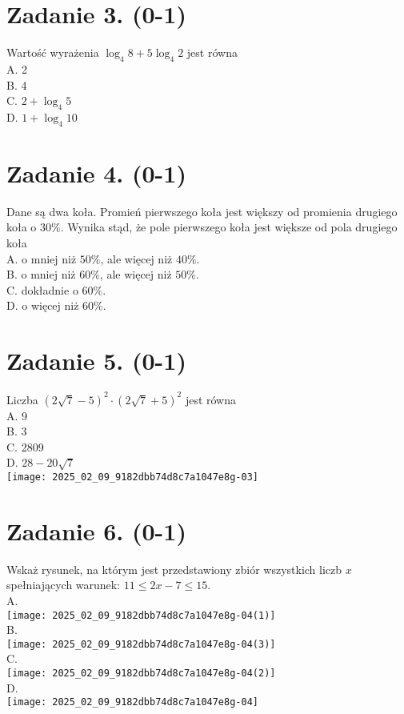 \documentclass[10pt]{article}
\begin{document}
\section*{Zadanie 3. (0-1)}
Wartość wyrażenia \(\log _{4} 8+5 \log _{4} 2\) jest równa\\
A. 2\\
B. 4\\
C. \(2+\log _{4} 5\)\\
D. \(1+\log _{4} 10\)

\section*{Zadanie 4. (0-1)}
Dane są dwa koła. Promień pierwszego koła jest większy od promienia drugiego koła o \(30 \%\). Wynika stąd, że pole pierwszego koła jest większe od pola drugiego koła\\
A. o mniej niż \(50 \%\), ale więcej niż \(40 \%\).\\
B. o mniej niż \(60 \%\), ale więcej niż \(50 \%\).\\
C. dokładnie o \(60 \%\).\\
D. o więcej niż \(60 \%\).

\section*{Zadanie 5. (0-1)}
Liczba \((2 \sqrt{7}-5)^{2} \cdot(2 \sqrt{7}+5)^{2}\) jest równa\\
A. 9\\
B. 3\\
C. 2809\\
D. \(28-20 \sqrt{7}\)\\
\texttt{[image: 2025\_02\_09\_9182dbb74d8c7a1047e8g-03]}

\section*{Zadanie 6. (0-1)}
Wskaż rysunek, na którym jest przedstawiony zbiór wszystkich liczb \(x\) spełniających warunek: \(11 \leq 2 x-7 \leq 15\).\\
A.\\
\texttt{[image: 2025\_02\_09\_9182dbb74d8c7a1047e8g-04(1)]}\\
B.\\
\texttt{[image: 2025\_02\_09\_9182dbb74d8c7a1047e8g-04(3)]}\\
C.\\
\texttt{[image: 2025\_02\_09\_9182dbb74d8c7a1047e8g-04(2)]}\\
D.\\
\texttt{[image: 2025\_02\_09\_9182dbb74d8c7a1047e8g-04]}
\end{document}
